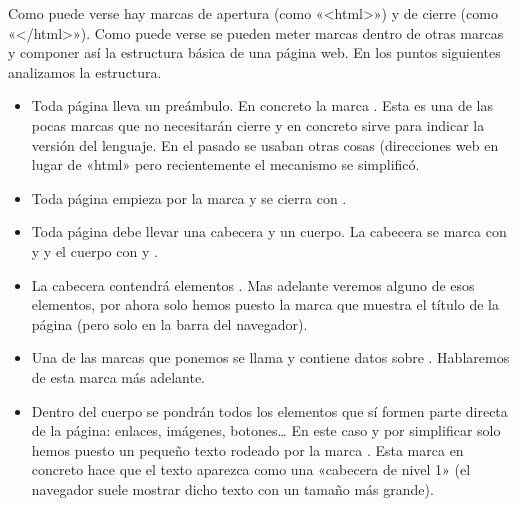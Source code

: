 \documentclass[a4paper,12pt,spanish]{sphinxmanual}
\begin{document}
Como puede verse hay marcas de apertura (como «\textless{}html\textgreater{}») y de cierre (como «\textless{}/html\textgreater{}»). Como puede verse se pueden meter marcas dentro de otras marcas y componer así la estructura básica de una página web. En los puntos siguientes analizamos la estructura.
\begin{itemize}
\item {} 
Toda página lleva un preámbulo. En concreto la marca . Esta es una de las pocas marcas que no necesitarán cierre y en concreto sirve para indicar la versión del lenguaje. En el pasado se usaban otras cosas (direcciones web en lugar de «html» pero recientemente el mecanismo se simplificó.

\item {} 
Toda página empieza por la marca  y se cierra con .

\item {} 
Toda página debe llevar una cabecera y un cuerpo. La cabecera se marca con  y  y el cuerpo con  y .

\item {} 
La cabecera contendrá elementos . Mas adelante veremos alguno de esos elementos, por ahora solo hemos puesto la marca  que muestra el título de la página (pero solo en la barra del navegador).

\item {} 
Una de las marcas que ponemos se llama  y contiene datos sobre . Hablaremos de esta marca más adelante.

\item {} 
Dentro del cuerpo se pondrán todos los elementos que sí formen parte directa de la página: enlaces, imágenes, botones… En este caso y por simplificar solo hemos puesto un pequeño texto rodeado por la marca . Esta marca en concreto hace que el texto aparezca como una «cabecera de nivel 1» (el navegador suele mostrar dicho texto con un tamaño más grande).

\end{itemize}
\end{document}
